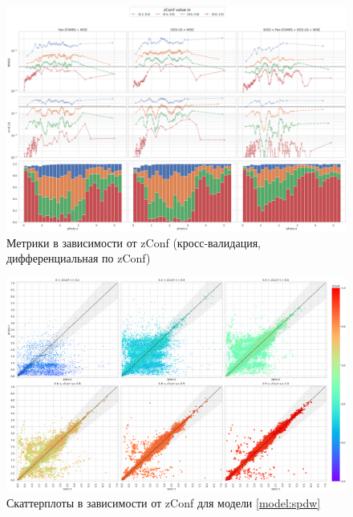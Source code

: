 \documentclass[fleqn,usenatbib]{mnras}
\begin{document}
\begin{figure}
    \centering
    \includegraphics[width=0.99\linewidth]{images/metrics-zconf-cv2-log.png}
    \caption{Метрики в зависимости от zConf (кросс-валидация, дифференциальная по zConf)}
    \label{fig:metrics-zconf-cv2}
\end{figure}

\begin{figure}
    \centering
    \includegraphics[width=0.99\linewidth]{images/zconf-scatterplot-35.png}
    \caption{Скаттерплоты в зависимости от zConf для модели \ref{model:spdw}}
    \label{fig:zconf-scatterplot-35}
\end{figure}
\end{document}

